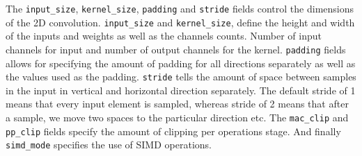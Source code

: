 \documentclass[12pt,a4paper,english
]{tunithesis}
\begin{document}
The \texttt{input\_size}, \texttt{kernel\_size}, \texttt{padding} and \texttt{stride} fields control the dimensions of the 2D convolution. \texttt{input\_size} and \texttt{kernel\_size}, define the height and width of the inputs and weights as well as the channels counts. Number of input channels for input and number of output channels for the kernel. \texttt{padding} fields allows for specifying the amount of padding for all directions separately as well as the values used as the padding. \texttt{stride} tells the amount of space between samples in the input in vertical and horizontal direction separately. The default stride of 1 means that every input element is sampled, whereas stride of 2 means that after a sample, we move two spaces to the particular direction etc. The \texttt{mac\_clip} and \texttt{pp\_clip} fields specify the amount of clipping per operations stage. And finally \texttt{simd\_mode} specifies the use of SIMD operations.




\end{document}
